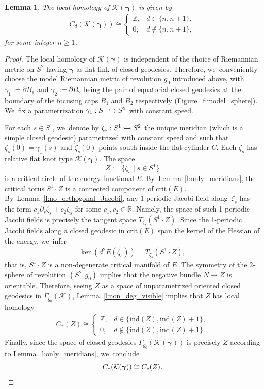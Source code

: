 \documentclass[JEP,XML,SOM,Unicode,NoFloatCountersInSection,published]{cedram}
\let\sep\mid
\newcommand\hto{\mathrel{\lhook\joinrel\to}}
\let\bm\boldsymbol
\newcommand{\Z}{\mathbb{Z}}
\newcommand{\R}{\mathbb{R}}
\newcommand{\KK}{\mathcal{K}}
\newcommand{\crit}{\mathrm{crit}}
\newcommand{\ind}{\mathrm{ind}}
\theoremstyle{plain}
\newtheorem{Lemma}[Thm]{Lemma}
\theoremstyle{definition}
\begin{document}
\begin{Lemma}\label{l:K_gamma1_gamma2}
The local homology of $\KK(\bm\gamma)$ is given by
\begin{align*}
C_d(\KK(\bm\gamma))
\cong
\begin{cases}
\Z, & d\in\{n,n+1\}, \\
0, & d\not\in\{n,n+1\},
\end{cases}
\end{align*}
for some integer $n\geq1$.
\end{Lemma}

\begin{proof}
The local homology of $\KK(\bm\gamma)$ is independent of the choice of Riemannian metric on $S^2$ having $\bm\gamma$ as flat link of closed geodesics. Therefore, we~conveniently choose the model Riemannian metric of revolution $g_0$ introduced above, with $\gamma_1:=\partial B_1$ and $\gamma_2:=\partial B_2$ being the pair of equatorial closed geodesics at the boundary of the focusing caps $B_1$ and $B_2$ respectively (Figure~\ref{f:model_sphere}). We~fix a parametrization $\gamma_1:S^1\hto S^2$ with constant speed.

For each $s\in S^1$, we~denote by $\zeta_s:S^1\hto S^2$ the unique meridian (which is a simple closed geodesic) parametrized with constant speed and such that $\zeta_s(0)=\gamma_1(s)$ and $\dot\zeta_s(0)$ points south inside the flat cylinder $C$. Each $\zeta_s$ has relative flat knot type $\KK(\bm\gamma)$.
The space
\[
Z:=\big\{\zeta_s\sep s\in S^1\big\}
\]
is a critical circle of the energy functional $E$. By~Lemma~\ref{l:only_meridians}, the critical torus $S^1\cdot Z$ is a connected component of $\crit(E)$. By~Lemma~\ref{l:no_orthogonal_Jacobi}, any 1-periodic Jacobi field along~$\zeta_s$ has the form $c_1\partial_s\zeta_s+c_2\dot\zeta_s$ for some $c_1,c_2\in\R$. Namely, the space of such 1-periodic Jacobi fields is precisely the tangent space $T_{\zeta_s}(S^1\cdot Z)$. Since the 1-periodic Jacobi fields along a closed geodesic in $\crit(E)$ span the kernel of the Hessian of the energy, we~infer
\begin{align*}
\ker(d^2E(\zeta_s)) = T_{\zeta_s}(S^1\cdot Z),
\end{align*}
that is, $S^1\cdot Z$ is a non-degenerate critical manifold of $E$. The symmetry of the $2$\nobreakdash-sphere of revolution $(S^2,g_0)$ implies that the negative bundle $N\to Z$ is orientable. Therefore, seeing $Z$ as a space of unparametrized oriented closed geodesics in $\Gamma_{g_0}(\KK)$, Lemma~\ref{l:non_deg_visible} implies that $Z$ has local homology
\begin{align*}
C_*(Z)
\cong
\begin{cases}
\Z, & d\in\{\ind(Z),\ind(Z)+1\}, \\
0, & d\not\in\{\ind(Z),\ind(Z)+1\}.
\end{cases}
\end{align*}
Finally, since the space of closed geodesics $\Gamma_{g_0}(\KK(\bm\gamma))$ is precisely $Z$ according to Lemma~\ref{l:only_meridians}, we~conclude
\[
C_*(\KK(\bm\gamma))\cong C_*(Z).
\qedhere
\]
\end{proof}
\end{document}
